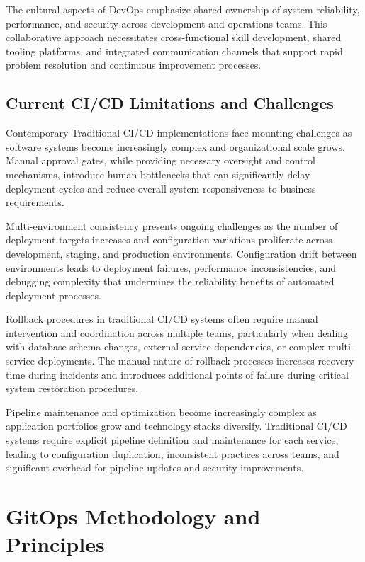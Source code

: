 The cultural aspects of DevOps emphasize shared ownership of system reliability, performance, and security across development and operations teams. This collaborative approach necessitates cross-functional skill development, shared tooling platforms, and integrated communication channels that support rapid problem resolution and continuous improvement processes.

\subsection{Current CI/CD Limitations and Challenges}

Contemporary Traditional CI/CD implementations face mounting challenges as software systems become increasingly complex and organizational scale grows. Manual approval gates, while providing necessary oversight and control mechanisms, introduce human bottlenecks that can significantly delay deployment cycles and reduce overall system responsiveness to business requirements.

Multi-environment consistency presents ongoing challenges as the number of deployment targets increases and configuration variations proliferate across development, staging, and production environments. Configuration drift between environments leads to deployment failures, performance inconsistencies, and debugging complexity that undermines the reliability benefits of automated deployment processes.

Rollback procedures in traditional CI/CD systems often require manual intervention and coordination across multiple teams, particularly when dealing with database schema changes, external service dependencies, or complex multi-service deployments. The manual nature of rollback processes increases recovery time during incidents and introduces additional points of failure during critical system restoration procedures.

Pipeline maintenance and optimization become increasingly complex as application portfolios grow and technology stacks diversify. Traditional CI/CD systems require explicit pipeline definition and maintenance for each service, leading to configuration duplication, inconsistent practices across teams, and significant overhead for pipeline updates and security improvements.

\section{GitOps Methodology and Principles}

